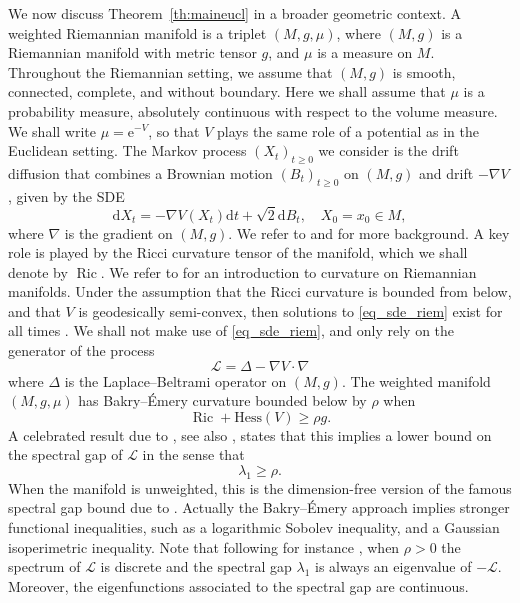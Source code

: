 \documentclass[10pt,reqno]{amsart}
\numberwithin{equation}{section}
\begin{document}
We now discuss Theorem~\ref{th:maineucl} in a broader geometric context. A
weighted Riemannian manifold is a triplet $(M, g, \mu)$, where $(M, g)$ is a
Riemannian manifold with metric tensor $g$, and $\mu$ is a measure on $M$.
Throughout the Riemannian setting, we assume that $(M,g)$ is smooth,
connected, complete, and without boundary.
Here we shall assume that $\mu$ is a probability measure, absolutely
continuous with respect to the volume measure. We shall write
$\mu =\mathrm{e}^{-V}$, so that $V$ plays the same role of a potential as in
the Euclidean setting. The Markov process ${(X_t)}_{t\geq0}$ we consider is
the drift diffusion that combines a Brownian motion ${(B_t)}_{t \geq 0}$ on
$(M, g)$ and drift $-\nabla V$, given by the SDE
\begin{equation} \label{eq_sde_riem}
  \mathrm{d}X_t = -\nabla V(X_t)\mathrm{d}t + \sqrt{2}\mathrm{d}B_t,
  \quad X_0=x_0\in M,
\end{equation}
where $\nabla$ is the gradient on $(M,g)$. We refer to \cite{BGL14} and \cite{Hsu} for
more background. A key role is played by the Ricci curvature tensor of the
manifold, which we shall denote by $\operatorname{Ric}$. We refer to
\cite{Oll13} for an introduction to curvature on Riemannian manifolds. Under
the assumption that the Ricci curvature is bounded from below, and that $V$ is
geodesically semi-convex, then solutions to \eqref{eq_sde_riem}
exist for all times \cite[Th.~11.8]{Grig}. We shall not make use of 
\eqref{eq_sde_riem}, and only rely on the generator of the process
\begin{equation}\label{eq:L:riem}
\mathcal{L} = \Delta - \nabla V \cdot \nabla
\end{equation}
where $\Delta$ is the Laplace--Beltrami operator on $(M,g)$. The weighted
manifold $(M, g, \mu)$ has Bakry--Émery curvature bounded below by $\rho$
when
\begin{equation}\label{eq:BErho}
  \operatorname{Ric} + \mathrm{Hess}(V) \geq \rho g.
\end{equation}
A celebrated result due to \cite{BE85}, see
also \cite{BGL14}, states that this implies a lower bound on the spectral gap
of $\mathcal{L}$ in the sense that
\begin{equation}
\lambda_1 \geq \rho. 
\end{equation}
When the manifold is unweighted, this is the dimension-free version of the
famous spectral gap bound due to \cite{Lic58}. Actually the Bakry--Émery
approach implies stronger functional inequalities, such as a logarithmic
Sobolev inequality, and a Gaussian isoperimetric inequality. Note that
following for instance \cite[Prop.~6.7]{GMS15}, when $\rho > 0$ the spectrum
of $\mathcal{L}$ is discrete and the spectral gap $\lambda_1$ is always an
eigenvalue of $-\mathcal{L}$. Moreover, the eigenfunctions associated to the
spectral gap are continuous.
\end{document}
